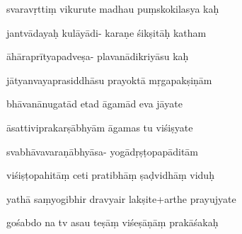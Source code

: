 \documentclass[article,12pt,a4paper]{memoir}%
\newcounter{parCount}
\begin{document}
	  
	  \pstart {} svaravṛttiṃ vikurute madhau puṃskokilasya kaḥ 
	{}
	\pend%
      

	  
	  \pstart \leavevmode%
	jantvādayaḥ kulāyādi- karaṇe śikṣitāḥ katham 
	{}
	\pend%
      

	  
	  \pstart {} āhāraprītyapadveṣa- plavanādikriyāsu kaḥ 
	{}
	\pend%
      

	  
	  \pstart \leavevmode%
	jātyanvayaprasiddhāsu prayoktā mṛgapakṣiṇām 
	{}
	\pend%
      

	  
	  \pstart {} bhāvanānugatād etad āgamād eva jāyate 
	{}
	\pend%
      

	  
	  \pstart \leavevmode%
	āsattiviprakarṣābhyām āgamas tu viśiṣyate 
	{}
	\pend%
      

	  
	  \pstart {} svabhāvavaraṇābhyāsa- yogādṛṣṭopapāditām 
	{}
	\pend%
      

	  
	  \pstart \leavevmode%
	viśiṣṭopahitāṃ ceti pratibhāṃ ṣaḍvidhāṃ viduḥ 
	{}
	\pend%
      

	  
	  \pstart {} yathā saṃyogibhir dravyair lakṣite+arthe prayujyate 
	{}
	\pend%
      

	  
	  \pstart \leavevmode%
	gośabdo na tv asau teṣāṃ viśeṣāṇāṃ prakāśakaḥ 
	{}
	\pend%
      
\end{document}
